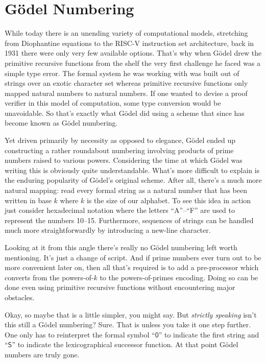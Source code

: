 \documentclass{article}
\theoremstyle{customstyle}
\newcommand{\fm}[1]{\mathsf{#1}}
\begin{document}
\section{Gödel Numbering}

While today there is an unending variety of computational models, stretching from Diophantine equations to the RISC-V instruction set architecture, back in 1931 there were only very few available options. That's why when Gödel drew the primitive recursive functions from the shelf the very first challenge he faced was a simple type error. The formal system he was working with was built out of strings over an exotic character set whereas primitive recursive functions only mapped natural numbers to natural numbers. If one wanted to devise a proof verifier in this model of computation, some type conversion would be unavoidable. So that's exactly what Gödel did using a scheme that since has become known as Gödel numbering.

Yet driven primarily by necessity as opposed to elegance, Gödel ended up constructing a rather roundabout numbering involving products of prime numbers raised to various powers. Considering the time at which Gödel was writing this is obviously quite understandable. What's more difficult to explain is the enduring popularity of Gödel's original scheme. After all, there's a much more natural mapping: read every formal string as a natural number that has been written in base $k$ where $k$ is the size of our alphabet. To see this idea in action just consider hexadecimal notation where the letters ``A''--``F'' are used to represent the numbers 10--15. Furthermore, sequences of strings can be handled much more straightforwardly by introducing a new-line character.

Looking at it from this angle there's really no Gödel numbering left worth mentioning. It's just a change of script. And if prime numbers ever turn out to be more convenient later on, then all that's required is to add a pre-processor which converts from the powers-of-$k$ to the powers-of-primes encoding. Doing so can be done even using primitive recursive functions without encountering major obstacles.

Okay, so maybe that is a little simpler, you might say. But \emph{strictly speaking} isn't this still a Gödel numbering? Sure. That is unless you take it one step further. One only has to reinterpret the formal symbol ``$\fm{0}$'' to indicate the first string and ``$\fm{S}$'' to indicate the lexicographical successor function. At that point Gödel numbers are truly gone.
\end{document}
